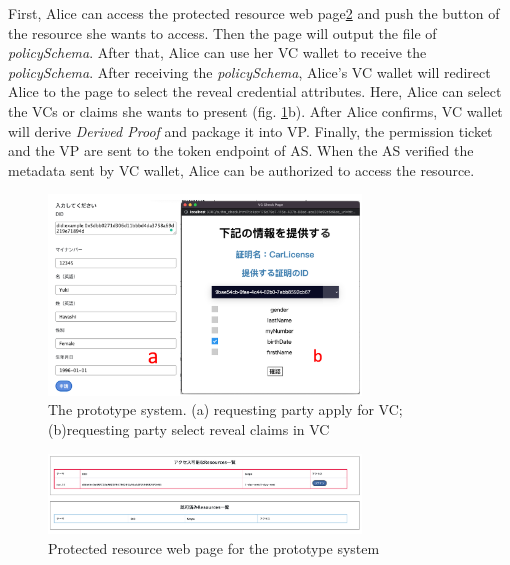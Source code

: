 \documentclass[conference, dvipdfmx]{IEEEtran} %
\begin{document}
\begin{sloppypar}
First, Alice can access the protected resource web page\ref{fig:access_resource} and push the button of the resource she wants to access. Then the page will output the file of \textit{policySchema}. After that, Alice can use her VC wallet to receive the \textit{policySchema}. 
After receiving the \textit{policySchema}, Alice's VC wallet will redirect Alice to the page to select the reveal credential attributes. 
Here, Alice can select the VCs or claims she wants to present (fig. \ref{fig:applyvc_selectclaim}b). After Alice confirms, VC wallet will derive \textit{Derived Proof} and package it into VP.
Finally, the permission ticket and the VP are sent to the token endpoint of AS. When the AS verified the metadata sent by VC wallet, Alice can be authorized to access the resource.

\begin{figure}[htbp] %
  \begin{center} %
  \includegraphics[width=83mm]{images/applyvc_selectclaim.png} %
  \caption{The prototype system. (a) requesting party apply for VC; (b)requesting party select reveal claims in VC} %
  \label{fig:applyvc_selectclaim} %
  \end{center}
\end{figure}

\begin{figure}[htbp] %
  \begin{center} %
  \includegraphics[width=83mm]{images/access_resource.png} %
  \caption{Protected resource web page for the prototype system} %
  \label{fig:access_resource} %
  \end{center}
\end{figure}


\end{sloppypar}
\end{document}

